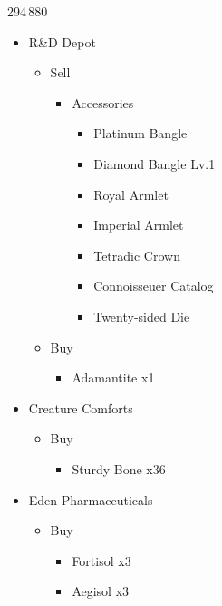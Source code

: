 \begin{shop}{294\,880}
	\begin{itemize}
		\item R\&D Depot
			\begin{itemize}
				\item Sell
					\begin{itemize}
						\item Accessories
							\begin{itemize}
								\item Platinum Bangle
								\item Diamond Bangle Lv.1
								\item Royal Armlet
								\item Imperial Armlet
								\item Tetradic Crown
								\item Connoisseuer Catalog
								\item Twenty-sided Die
							\end{itemize}
					\end{itemize}
				\item Buy
					\begin{itemize}
						\item Adamantite x1
					\end{itemize}
			\end{itemize}
		\item Creature Comforts
			\begin{itemize}
				\item Buy
					\begin{itemize}
						\item Sturdy Bone x36
					\end{itemize}
			\end{itemize}
		\item Eden Pharmaceuticals
			\begin{itemize}
				\item Buy
					\begin{itemize}
						\item Fortisol x3
						\item Aegisol x3
					\end{itemize}
			\end{itemize}		
	\end{itemize}
\end{shop}

